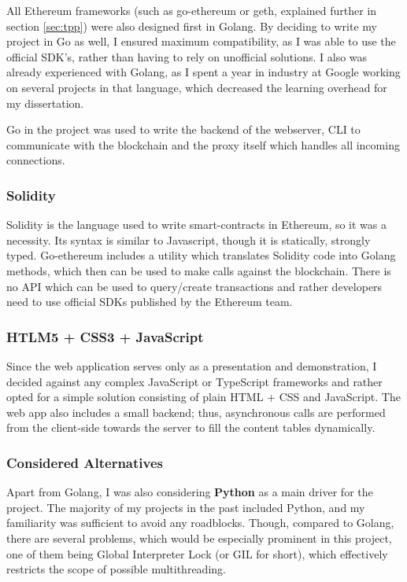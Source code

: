 All Ethereum frameworks (such as go-ethereum or geth, explained further in section \ref{sec:tpp}) were also designed first in Golang. By deciding to write my project in Go as well, I ensured maximum compatibility, as I was able to use the official SDK's, rather than having to rely on unofficial solutions. I also was already experienced with Golang, as I spent a year in industry at Google working on several projects in that language, which decreased the learning overhead for my dissertation.

Go in the project was used to write the backend of the webserver, CLI to communicate with the blockchain and the proxy itself which handles all incoming connections.
\subsubsection{Solidity}
Solidity \cite{dannen2017introducing} is the language used to write smart-contracts in Ethereum, so it was a necessity. Its syntax is similar to Javascript, though it is statically, strongly typed. Go-ethereum includes a utility which translates Solidity code into Golang methods, which then can be used to make calls against the blockchain. There is no API which can be used to query/create transactions and rather developers need to use official SDKs published by the Ethereum team.
\subsubsection{HTLM5 + CSS3 + JavaScript}
Since the web application serves only as a presentation and demonstration, I decided against any complex JavaScript or TypeScript frameworks and rather opted for a simple solution consisting of plain HTML + CSS and JavaScript. The web app also includes a small backend; thus, asynchronous calls are performed from the client-side towards the server to fill the content tables dynamically.
\subsubsection{Considered Alternatives}
Apart from Golang, I was also considering \textbf{Python} as a main driver for the project. The majority of my projects in the past included Python, and my familiarity was sufficient to avoid any roadblocks. Though, compared to Golang, there are several problems, which would be especially prominent in this project, one of them being Global Interpreter Lock\cite{beazley2010understanding} (or GIL for short), which effectively restricts the scope of possible multithreading.

